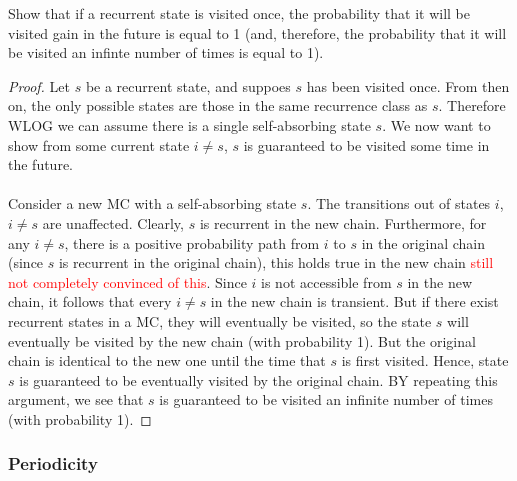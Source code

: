 \documentclass[11pt]{scrartcl}
\begin{document}
\begin{example}
  Show that if a recurrent state is visited once, the probability that it will
  be visited gain in the future is equal to 1 (and, therefore, the probability
  that it will be visited an infinte number of times is equal to 1).
  \begin{proof}
    Let $s$ be a recurrent state, and suppoes $s$ has been visited once. From
    then on, the only possible states are those in the same recurrence class as
    $s$. Therefore WLOG we can assume there is a single self-absorbing
    state $s$. We now want to show from some current state $i\neq s$,
    $s$ is guaranteed to be visited some time in the future.\\\\ Consider a new
    MC with a self-absorbing state $s$. The transitions out of states $i$,
    $i\neq s$ are unaffected. Clearly, $s$ is recurrent in the new chain.
    Furthermore, for any $i\neq s$, there is a positive probability path from
    $i$ to $s$ in the original chain (since $s$ is recurrent in the original
    chain), this holds true in the new chain \textcolor{red}{still not
    completely convinced of this}. Since $i$ is not accessible from $s$ in the
    new chain, it follows that  every $i\neq s$ in the new chain is transient.
    But if there exist recurrent states in a MC, they will eventually be
    visited, so the state $s$ will eventually be visited by the new chain (with
    probability 1). But the original chain is identical to the new one until
    the time that $s$ is first visited. Hence, state $s$ is guaranteed to be
    eventually visited by the original chain. BY repeating this argument, we
    see that $s$ is guaranteed to be visited an infinite number of times (with
    probability 1).
  \end{proof}
\end{example}

\subsubsection{Periodicity}
\end{document}
